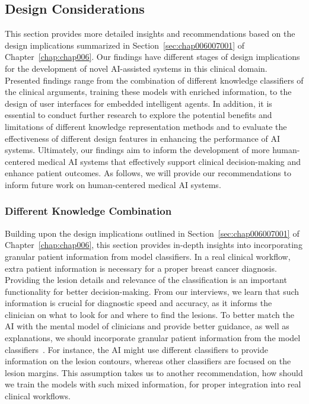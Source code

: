 \subsection{Design Considerations}
\label{sec:app005008001}

This section provides more detailed insights and recommendations based on the design implications summarized in Section~\ref{sec:chap006007001} of Chapter~\ref{chap:chap006}.
Our findings have different stages of design implications for the development of novel \ac{AI}-assisted systems in this clinical domain.
Presented findings range from the combination of different knowledge classifiers of the clinical arguments, training these models with enriched information, to the design of user interfaces for embedded intelligent agents.
In addition, it is essential to conduct further research to explore the potential benefits and limitations of different knowledge representation methods and to evaluate the effectiveness of different design features in enhancing the performance of \ac{AI} systems.
Ultimately, our findings aim to inform the development of more human-centered medical \ac{AI} systems that effectively support clinical decision-making and enhance patient outcomes.
As follows, we will provide our recommendations to inform future work on human-centered medical \ac{AI} systems.

\subsubsection{Different Knowledge Combination}
\label{sec:app005008001001}

Building upon the design implications outlined in Section~\ref{sec:chap006007001} of Chapter~\ref{chap:chap006}, this section provides in-depth insights into incorporating granular patient information from model classifiers.
In a real clinical workflow, extra patient information is necessary for a proper breast cancer diagnosis.
Providing the lesion details and relevance of the classification is an important functionality for better decision-making.
From our interviews, we learn that such information is crucial for diagnostic speed and accuracy, as it informs the clinician on what to look for and where to find the lesions.
To better match the \ac{AI} with the mental model of clinicians and provide better guidance, as well as explanations, we should incorporate granular patient information from the model classifiers~\cite{doi:10.1148/ryai.210299}.
For instance, the \ac{AI} might use different classifiers to provide information on the lesion contours, whereas other classifiers are focused on the lesion margins.
This assumption takes us to another recommendation, how should we train the models with such mixed information, for proper integration into real clinical workflows.

